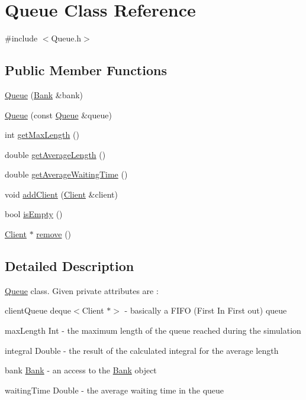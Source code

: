 \hypertarget{classQueue}{}\section{Queue Class Reference}
\label{classQueue}


{\ttfamily \#include $<$Queue.\+h$>$}

\subsection*{Public Member Functions}
\begin{DoxyCompactItemize}
\item 
\hyperlink{classQueue_ae2647f6001471e160dc95362aba43313}{Queue} (\hyperlink{classBank}{Bank} \&bank)
\item 
\hyperlink{classQueue_a4d325dcdfe0550824d529b7aa11535b8}{Queue} (const \hyperlink{classQueue}{Queue} \&queue)
\item 
int \hyperlink{classQueue_ac52fd0970c24510a4d0d3086b027021a}{get\+Max\+Length} ()
\item 
double \hyperlink{classQueue_afc73e60fa330498b5efdbf267d4508c2}{get\+Average\+Length} ()
\item 
double \hyperlink{classQueue_a21c1c1c4732177f6b8d8433ae5b4d771}{get\+Average\+Waiting\+Time} ()
\item 
void \hyperlink{classQueue_aa4545b1d42237801b75e0f20c3cc0587}{add\+Client} (\hyperlink{classClient}{Client} \&client)
\item 
bool \hyperlink{classQueue_a65d9b23c23c917faa44981539bc34be7}{is\+Empty} ()
\item 
\hyperlink{classClient}{Client} $\ast$ \hyperlink{classQueue_a2767e32f2c7f51eedf0b75af9d944f67}{remove} ()
\end{DoxyCompactItemize}


\subsection{Detailed Description}
\hyperlink{classQueue}{Queue} class. Given private attributes are \+:
\begin{DoxyItemize}
\item client\+Queue deque$<$\+Client $\ast$$>$ -\/ basically a F\+I\+FO (First In First out) queue
\item max\+Length Int -\/ the maximum length of the queue reached during the simulation
\item integral Double -\/ the result of the calculated integral for the average length
\item bank \hyperlink{classBank}{Bank} -\/ an access to the \hyperlink{classBank}{Bank} object
\item waiting\+Time Double -\/ the average waiting time in the queue 
\end{DoxyItemize}

